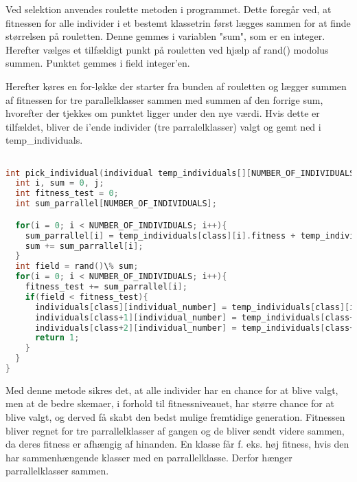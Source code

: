 Ved selektion anvendes roulette metoden i programmet. Dette foregår ved, at fitnessen for alle individer i et bestemt klassetrin først lægges sammen for at finde størrelsen på rouletten. Denne gemmes i variablen "sum", som er en integer. Herefter vælges et tilfældigt punkt på rouletten ved hjælp af rand() modolus summen. Punktet gemmes i field integer'en.

Herefter køres en for-løkke der starter fra bunden af rouletten og lægger summen af fitnessen for tre parallelklasser sammen med summen af den forrige sum, hvorefter der tjekkes om punktet ligger under den nye værdi. Hvis dette er tilfældet, bliver de i'ende individer (tre parralelklasser) valgt og gemt ned i temp_individuals.  

\begin{lstlisting}[language = c]

int pick_individual(individual temp_individuals[][NUMBER_OF_INDIVIDUALS], individual individuals[][NUMBER_OF_INDIVIDUALS], int class, int individual_number){
  int i, sum = 0, j;
  int fitness_test = 0;
  int sum_parrallel[NUMBER_OF_INDIVIDUALS];

  for(i = 0; i < NUMBER_OF_INDIVIDUALS; i++){
    sum_parrallel[i] = temp_individuals[class][i].fitness + temp_individuals[class+1][i].fitness + temp_individuals[class+2][i].fitness;
    sum += sum_parrallel[i];
  }
  int field = rand()\% sum;
  for(i = 0; i < NUMBER_OF_INDIVIDUALS; i++){
    fitness_test += sum_parrallel[i];
    if(field < fitness_test){
      individuals[class][individual_number] = temp_individuals[class][i];
      individuals[class+1][individual_number] = temp_individuals[class+1][i];
      individuals[class+2][individual_number] = temp_individuals[class+2][i];
      return 1;
    }
  } 
}

\end{lstlisting}

Med denne metode sikres det, at alle individer har en chance for at blive valgt, men at de bedre skemaer, i forhold til fitnessniveauet, har større chance for at blive valgt, og derved få skabt den bedst mulige fremtidige generation. Fitnessen bliver regnet for tre parrallelklasser af gangen og de bliver sendt videre sammen, da deres fitness er afhængig af hinanden. En klasse får f. eks. høj fitness, hvis den har sammenhængende klasser med en parrallelklasse. Derfor hænger parrallelklasser sammen.  